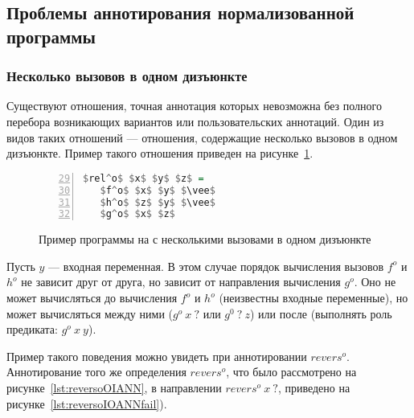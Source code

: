 \subsection{Проблемы аннотирования нормализованной программы}
\label{lab:problems}


\subsubsection{Несколько вызовов в одном дизъюнкте}
\label{lab:disjPerm}

Существуют отношения, точная аннотация которых невозможна без полного перебора возникающих вариантов или пользовательских аннотаций.
Один из видов таких отношений --- отношения, содержащие несколько вызовов в одном дизъюнкте.
Пример такого отношения приведен на рисунке~\ref{lst:reloDEF}.

\begin{figure}[h!]
  \begin{center}
  \begin{minipage}{0.25\textwidth}
  \begin{lstlisting}[language=Haskell, frame=single, numbers=left,numberstyle=\small, firstnumber=29, escapechar=|]
 $rel^o$ $x$ $y$ $z$ =
   $f^o$ $x$ $y$ $\vee$
   $h^o$ $z$ $y$ $\vee$
   $g^o$ $x$ $z$
    \end{lstlisting}
  \end{minipage}
  \end{center}
  \caption{Пример программы на \miniKanren{} с несколькими вызовами в одном дизъюнкте}
  \label{lst:reloDEF}
\end{figure}

Пусть $y$ --- входная переменная.
В этом случае порядок вычисления вызовов $f^o$ и $h^o$ не зависит друг от друга, но зависит от направления вычисления $g^o$.
Оно не может вычисляться до вычисления $f^o$ и $h^o$ (неизвестны входные переменные), но может вычисляться между ними ($g^o \ x \ ?$ или $g^0 \ ? \ z$) или после (выполнять роль предиката: $g^o \ x \ y$).

Пример такого поведения можно увидеть при аннотировании $revers^o$.
Аннотирование того же определения $revers^o$, что было рассмотрено на рисунке~\ref{lst:reversoOIANN}, в направлении $revers^o \ x \ ?$, приведено на рисунке~\ref{lst:reversoIOANNfail}).

